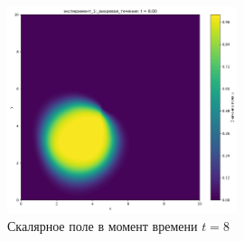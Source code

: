 \begin{figure}[h]
	\centering
	\includegraphics[width=0.6\textwidth]{imgs/эксперимент_1:_вихревое_течение_t8.00.png}
	\caption{Скалярное поле в момент времени $t=8$ }
\end{figure}